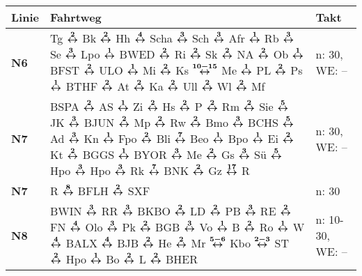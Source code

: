 \begin{minipage}[t]{0.05\textwidth}
\phantom{Tor}
\end{minipage}
\begin{minipage}[t]{0.45\textwidth}
\begin{tabular}{>{\bfseries}L{1.2cm}L{9.0cm}L{3.0cm}}
{\bfseries Linie} & {\bfseries Fahrtweg} & {\bfseries Takt} \\
\hline
\nbus{} N6    & Tg $\xarwe{2}$ Bk $\xarwe{2}$ Hh $\xarwe{4}$ Scha $\xarwe{3}$ Sch $\xarwe{3}$ Afr $\xarwe{1}$ Rb $\xarwe{3}$ Se $\xarwe{3}$ Lpo $\xarwe{1}$ BWED $\xarwe{2}$ Ri     %
                $\xarwe{2}$ Sk $\xarwe{2}$ NA $\xarwe{2}$ Ob $\xarwe{1}$ BFST $\xarwe{2}$ ULO $\xarwe{1}$ Mi $\xarwe{2}$ Ks $\xarwe{10-15}$ Me $\xarwe{1}$ PL $\xarwe{2}$ Ps        %
                $\xarwe{1}$ BTHF $\xarwe{2}$ At $\xarwe{2}$ Ka $\xarwe{2}$ Ull $\xarwe{2}$ Wl $\xarwe{2}$ Mf                                                                        & n: 30, WE: --              \\
\nbus{} N7    & BSPA $\xarwe{2}$ AS $\xarwe{1}$ Zi $\xarwe{2}$ Hs $\xarwe{2}$ P $\xarwe{2}$ Rm $\xarwe{2}$ Sie $\xarwe{5}$ JK $\xarwe{3}$ BJUN $\xarwe{2}$ Mp $\xarwe{2}$ Rw        %
                $\xarwe{2}$ Bmo $\xarwe{3}$ BCHS $\xarwe{5}$ Ad $\xarwe{3}$ Kn $\xarwe{1}$ Fpo $\xarwe{2}$ Bli $\xarwe{7}$ Beo $\xarwe{1}$ Bpo $\xarwe{1}$ Ei $\xarwe{2}$ Kt        %
                $\xarwe{2}$ BGGS $\xarwe{1}$ BYOR $\xarwe{3}$ Me $\xarwe{2}$ Gs $\xarwe{3}$ Sü $\xarwe{5}$ Hpo $\xarwe{3}$ Hpo $\xarwe{3}$ Rk $\xarwe{7}$ BNK $\xarwe{2}$ Gz        %
                $\xarwe{17}$ R                                                                                                                                                      & n: 30, WE: --              \\
\nbus{} N7    & R $\xarwe{8}$ BFLH $\xarwe{2}$ SXF                                                                                                                                  & n: 30                      \\
\nbus{} N8    & BWIN $\xarwe{3}$ RR $\xarwe{3}$ BKBO $\xarwe{2}$ LD $\xarwe{2}$ PB $\xarwe{3}$ RE $\xarwe{2}$ FN $\xarwe{4}$ Olo $\xarwe{3}$ Pk $\xarwe{2}$ BGB $\xarwe{3}$ Vo      %
                $\xarwe{1}$ B $\xarwe{2}$ Ro $\xarwe{1}$ W $\xarwe{4}$ BALX $\xarwe{4}$ BJB $\xarwe{2}$ He $\xarwe{2}$ Mr $\xarwe{5-6}$ Kbo $\xarwe{2-3}$ ST $\xarwe{2}$ Hpo        %
                $\xarwe{1}$ Bo $\xarwe{2}$ L $\xarwe{2}$ BHER                                                                                                                       & n: 10-30, WE: --           \\

\end{tabular}
\end{minipage}
